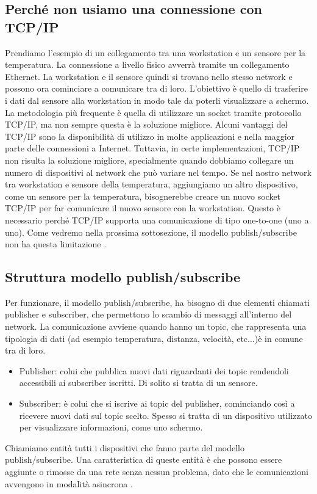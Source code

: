 \subsection{Perché non usiamo una connessione con TCP/IP}
Prendiamo l'esempio di un collegamento tra una workstation e 
un sensore per la temperatura. La connessione a livello fisico
avverrà tramite un collegamento Ethernet. La workstation e il 
sensore quindi si trovano nello stesso network e possono 
ora cominciare a comunicare tra di loro. L'obiettivo è quello
di trasferire i dati dal sensore alla workstation in modo tale
da poterli visualizzare a schermo.
La metodologia più frequente è quella di utilizzare un socket tramite 
protocollo TCP/IP, ma non sempre questa è la soluzione migliore.
Alcuni vantaggi del TCP/IP sono la disponibilità di utilizzo 
in molte applicazioni e nella maggior parte 
delle connessioni a Internet.
Tuttavia, in certe implementazioni, TCP/IP non risulta la soluzione migliore,
specialmente quando dobbiamo collegare un numero di dispositivi al 
network che può variare nel tempo. Se nel nostro network tra workstation e 
sensore della temperatura, aggiungiamo un altro dispositivo, come un 
sensore per la temperatura, bisognerebbe creare un nuovo socket 
TCP/IP per far comunicare il nuovo sensore con la workstation.
Questo è necessario perché TCP/IP supporta una comunicazione di tipo 
one-to-one (uno a uno). Come vedremo nella prossima sottosezione,
il modello publish/subscribe non ha questa limitazione \cite{1494965}.

\subsection{Struttura modello publish/subscribe}
Per funzionare, il modello publish/subscribe, ha bisogno di
due elementi chiamati publisher e subscriber, 
che permettono lo scambio di messaggi all'interno del network.
La comunicazione avviene 
quando hanno un topic, che
rappresenta una tipologia di dati (ad esempio temperatura, 
distanza, velocità, etc...)è in comune tra di loro.
\begin{itemize}
    \item Publisher: colui che pubblica nuovi dati riguardanti dei
    topic rendendoli accessibili ai subscriber iscritti. 
    Di solito si tratta di un sensore.
    \item Subscriber: è colui che si iscrive ai topic del publisher, 
    cominciando
    così a ricevere nuovi dati sul topic scelto. Spesso si tratta
    di un dispositivo utilizzato per visualizzare informazioni, come uno
    schermo.
\end{itemize}
Chiamiamo entità tutti i dispositivi che fanno parte del modello 
publish/subscribe.
Una caratteristica di queste entità è che possono essere aggiunte o rimosse
da una rete senza nessun problema, dato che le 
comunicazioni avvengono in modalità asincrona \cite{dds1.4}. 

